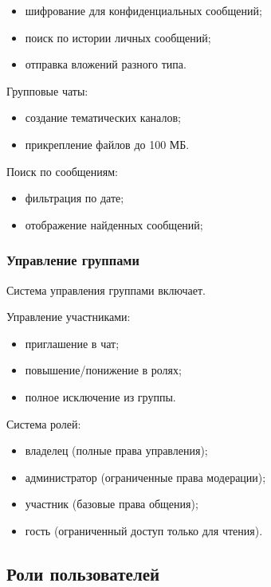 	\begin{itemize}
		\item шифрование для конфиденциальных сообщений;
		\item поиск по истории личных сообщений;
		\item отправка вложений разного типа.
	\end{itemize}
	
Групповые чаты:

	\begin{itemize}
		\item создание тематических каналов;
		\item прикрепление файлов до 100 МБ.
	\end{itemize}
	
Поиск по сообщениям:

	\begin{itemize}
		\item фильтрация по дате;
		\item отображение найденных сообщений;
	\end{itemize}
	
\subsubsection{Управление группами}

Система управления группами включает.
	
Управление участниками:

	\begin{itemize}
		\item приглашение в чат;
		\item повышение/понижение в ролях;
		\item полное исключение из группы.
	\end{itemize}
	
Система ролей:

	\begin{itemize}
		\item владелец (полные права управления);
		\item администратор (ограниченные права модерации);
		\item участник (базовые права общения);
		\item гость (ограниченный доступ только для чтения).
	\end{itemize}
	

\subsection{Роли пользователей}


